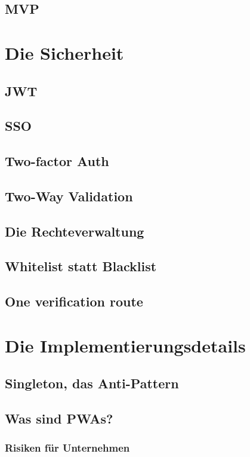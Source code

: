 \section{MVP}

\chapter{Die Sicherheit}
\section{JWT}
\section{SSO}
\section{Two-factor Auth}
\section{Two-Way Validation}
\section{Die Rechteverwaltung}
\section{Whitelist statt Blacklist}
\section{One verification route}

\chapter{Die Implementierungsdetails}

\section{Singleton, das Anti-Pattern}
\section{Was sind PWAs?}

\subsection{Risiken für Unternehmen}

